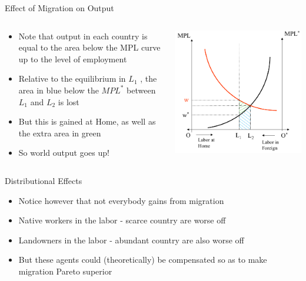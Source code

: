 \documentclass[10pt,hyperref={CJKbookmarks=true},xcolor=dvipsnames,aspectratio=169]{beamer}
\begin{document}
\begin{frame}{Effect of Migration on Output }


\begin{columns}[onlytextwidth]
\begin{column}{0.4\textwidth}
\begin{itemize}
\item Note that output in each country is equal to the area below the MPL
curve up to the level of employment 
\item Relative to the equilibrium in $L_{1}$ , the area in blue below the
$MPL^{*}$ between $L_{1}$ and $L_{2}$ is lost 
\item But this is gained at Home, as well as the extra area in green 
\item So world output goes up! 
\end{itemize}

\end{column}
\begin{column}{0.6\textwidth}
\includegraphics[width=0.8\columnwidth]{fig/migration/lec4-30}
\end{column}
\end{columns}

\end{frame}

\begin{frame}{Distributional Effects}

\begin{itemize}
\item Notice however that not everybody gains from migration 
\item Native workers in the labor - scarce country are worse off 
\item Landowners in the labor - abundant country are also worse off 
\item But these agents could (theoretically) be compensated so as to make
migration Pareto superior
\end{itemize}
\end{frame}
\end{document}
